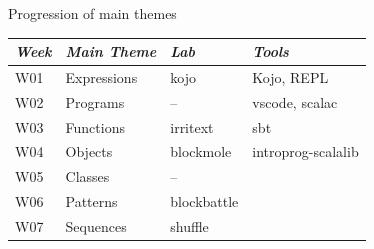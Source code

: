 \documentclass[aspectratio=169]{beamer}
\newenvironment{Slide}[1]%
  {\begin{frame}[environment=Slide]{#1}}
  {\end{frame}}%
\begin{document}
\begin{Slide}{Progression of main themes}
  \begin{minipage}{0.54\textwidth}
    \fontsize{8.7}{10}\selectfont
    \begin{tabular}{|l|l|l|l|} 
      \textit{Week} & \textit{Main Theme} & \textit{Lab} & \textit{Tools}\\ \hline \hline
      W01 & Expressions     & kojo        & Kojo, REPL\\
      W02 & Programs        & --          & vscode, scalac\\
      W03 & Functions       & irritext    & sbt\\
      W04 & Objects         & blockmole   & introprog-scalalib\\
      W05 & Classes         & --          & \\
      W06 & Patterns        & blockbattle & \\
      W07 & Sequences       &  shuffle    & \\ \hline 

\end{tabular}
\end{minipage}
\end{Slide}
\end{document}
